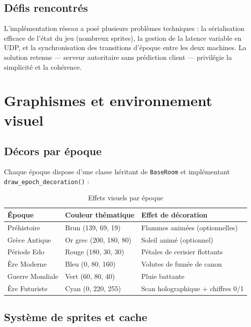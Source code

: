 \documentclass[12pt, a4paper]{report}
\begin{document}
\subsection{D\'{e}fis rencontr\'{e}s}

L'impl\'{e}mentation r\'{e}seau a pos\'{e} plusieurs probl\`{e}mes techniques : la s\'{e}rialisation efficace de l'\'{e}tat du jeu (nombreux sprites), la gestion de la latence variable en UDP, et la synchronisation des transitions d'\'{e}poque entre les deux machines. La solution retenue --- serveur autoritaire sans pr\'{e}diction client --- privil\'{e}gie la simplicit\'{e} et la coh\'{e}rence.

\section{Graphismes et environnement visuel}

\subsection{D\'{e}cors par \'{e}poque}

Chaque \'{e}poque dispose d'une classe h\'{e}ritant de \texttt{BaseRoom} et impl\'{e}mentant \texttt{draw\_epoch\_decoration()} :

\begin{table}[H]
\centering
\caption{Effets visuels par \'{e}poque}
\begin{tabular}{lll}
\toprule
\textbf{\'{E}poque} & \textbf{Couleur th\'{e}matique} & \textbf{Effet de d\'{e}coration} \\
\midrule
Pr\'{e}histoire   & Brun (139, 69, 19)     & Flammes anim\'{e}es (optionnelles) \\
Gr\`{e}ce Antique & Or grec (200, 180, 80) & Soleil anim\'{e} (optionnel) \\
P\'{e}riode Edo   & Rouge (180, 30, 30)    & P\'{e}tales de cerisier flottants \\
\`{E}re Moderne   & Bleu (0, 80, 160)      & Volutes de fum\'{e}e de canon \\
Guerre Mondiale & Vert (60, 80, 40)      & Pluie battante \\
\`{E}re Futuriste & Cyan (0, 220, 255)     & Scan holographique + chiffres 0/1 \\
\bottomrule
\end{tabular}
\end{table}

\subsection{Syst\`{e}me de sprites et cache}
\end{document}
